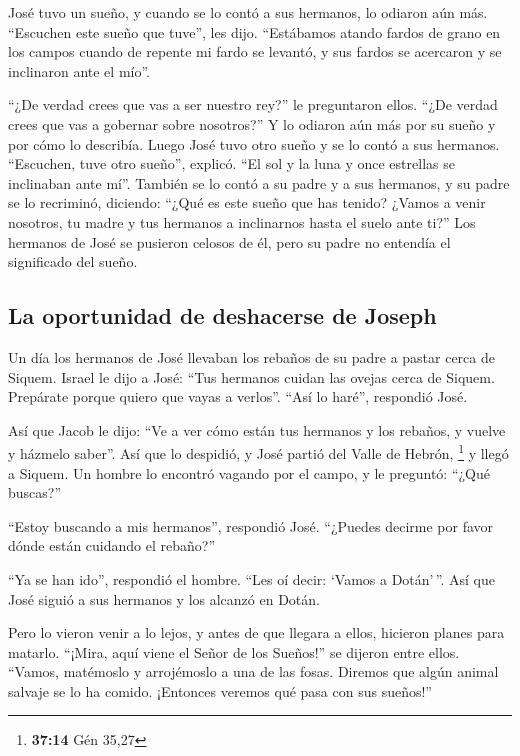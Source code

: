  José tuvo un sueño, y cuando se lo contó a sus hermanos,
lo odiaron aún más.  ``Escuchen este sueño que tuve'', les
dijo.  ``Estábamos atando fardos de grano en los campos
cuando de repente mi fardo se levantó, y sus fardos se acercaron y se
inclinaron ante el mío''.

 ``¿De verdad crees que vas a ser nuestro rey?'' le
preguntaron ellos. ``¿De verdad crees que vas a gobernar sobre
nosotros?'' Y lo odiaron aún más por su sueño y por cómo lo describía.
 Luego José tuvo otro sueño y se lo contó a sus hermanos.
``Escuchen, tuve otro sueño'', explicó. ``El sol y la luna y once
estrellas se inclinaban ante mí''.  También se lo contó a
su padre y a sus hermanos, y su padre se lo recriminó, diciendo: ``¿Qué
es este sueño que has tenido? ¿Vamos a venir nosotros, tu madre y tus
hermanos a inclinarnos hasta el suelo ante ti?''  Los
hermanos de José se pusieron celosos de él, pero su padre no entendía el
significado del sueño.

\hypertarget{la-oportunidad-de-deshacerse-de-joseph}{%
\subsection{La oportunidad de deshacerse de
Joseph}\label{la-oportunidad-de-deshacerse-de-joseph}}

 Un día los hermanos de José llevaban los rebaños de su
padre a pastar cerca de Siquem.  Israel le dijo a José:
``Tus hermanos cuidan las ovejas cerca de Siquem. Prepárate porque
quiero que vayas a verlos''. ``Así lo haré'', respondió José.

 Así que Jacob le dijo: ``Ve a ver cómo están tus
hermanos y los rebaños, y vuelve y házmelo saber''. Así que lo despidió,
y José partió del Valle de Hebrón, \footnote{\textbf{37:14} Gén 35,27}
 y llegó a Siquem. Un hombre lo encontró vagando por el
campo, y le preguntó: ``¿Qué buscas?''

 ``Estoy buscando a mis hermanos'', respondió José.
``¿Puedes decirme por favor dónde están cuidando el rebaño?''

 ``Ya se han ido'', respondió el hombre. ``Les oí decir:
`Vamos a Dotán'\,''. Así que José siguió a sus hermanos y los alcanzó en
Dotán.

 Pero lo vieron venir a lo lejos, y antes de que llegara
a ellos, hicieron planes para matarlo.  ``¡Mira, aquí
viene el Señor de los Sueños!'' se dijeron entre ellos. 
``Vamos, matémoslo y arrojémoslo a una de las fosas. Diremos que algún
animal salvaje se lo ha comido. ¡Entonces veremos qué pasa con sus
sueños!''

